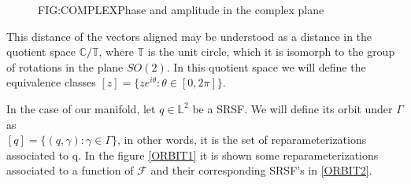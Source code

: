 \begin{figure}[Phase and amplitude in the complex plane]{FIG:COMPLEX}{Phase and amplitude in the complex plane}

 \quad
{}

\end{figure}


This distance of the vectors aligned may be understood as a distance in the
quotient space $\mathbb{C} / \mathbb{T}$, where $\mathbb{T}$ is the unit circle,
which it is isomorph to the group of rotations in the plane $SO(2)$. In this
quotient space we will define the equivalence classes
$[z] = \{z e^{i \theta} : \theta \in [0, 2\pi]\}$.

In the case of our manifold, let $q \in \mathbb{L}^2$ be a SRSF. We will define
its orbit under $\Gamma$ as \\$[q] = \{(q, \gamma) : \gamma \in \Gamma \}$, in
other words, it is the set of reparameterizations associated to q. In the
figure \ref{ORBIT1} it is shown some reparameterizations associated  to a function
of $\mathscr{F}$ and their corresponding SRSF's in \ref{ORBIT2}.


